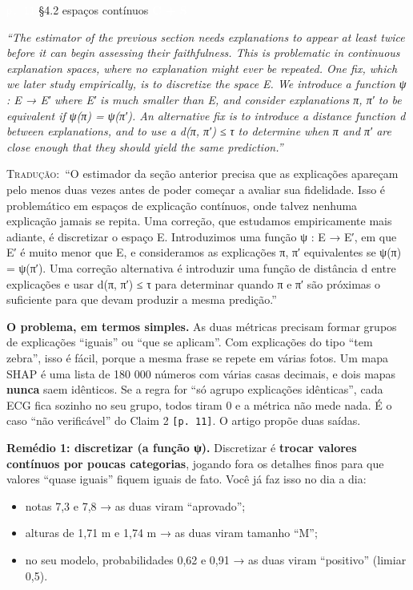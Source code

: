 \documentclass[11pt,a4paper]{article}
\newcommand{\metrictag}[2]{{\setlength{\fboxsep}{1.5pt}%
  \ifstrequal{#1}{c}{\colorbox{cC}{\textcolor{white}{\scriptsize\textbf{#2}}}}{%
  \ifstrequal{#1}{s}{\colorbox{cS}{\textcolor{white}{\scriptsize\textbf{#2}}}}{%
  \colorbox{black!60}{\textcolor{white}{\scriptsize\textbf{#2}}}}}}}
\newcommand{\pagechip}[1]{{\setlength{\fboxsep}{1.5pt}\colorbox{cAcc}{\textcolor{white}{\scriptsize\texttt{#1}}}}}
\newenvironment{origquote}{\par\itshape\small}{\par}
\newenvironment{tradquote}{\par\small\textsc{Tradução:}\ }{\par}
\newcommand{\explab}[1]{\par\smallskip{\small\color{cAcc}\textbf{\MakeUppercase{#1}}}\par}
\begin{document}
\begin{citacard}{\pagechip{p. 11} §4.2 espaços contínuos \metrictag{cs}{C + S}}
\begin{origquote}“The estimator of the previous section needs explanations to appear at least twice before it can begin assessing their faithfulness. This is problematic in continuous explanation spaces, where no explanation might ever be repeated. One fix, which we later study empirically, is to discretize the space E. We introduce a function ψ : E → E′ where E′ is much smaller than E, and consider explanations π, π′ to be equivalent if ψ(π) = ψ(π′). An alternative fix is to introduce a distance function d between explanations, and to use a d(π, π′) ≤ τ to determine when π and π′ are close enough that they should yield the same prediction.”\end{origquote}
\begin{tradquote}“O estimador da seção anterior precisa que as explicações apareçam pelo menos duas vezes antes de poder começar a avaliar sua fidelidade. Isso é problemático em espaços de explicação contínuos, onde talvez nenhuma explicação jamais se repita. Uma correção, que estudamos empiricamente mais adiante, é discretizar o espaço E. Introduzimos uma função ψ : E → E′, em que E′ é muito menor que E, e consideramos as explicações π, π′ equivalentes se ψ(π) = ψ(π′). Uma correção alternativa é introduzir uma função de distância d entre explicações e usar d(π, π′) ≤ τ para determinar quando π e π′ são próximas o suficiente para que devam produzir a mesma predição.”\end{tradquote}
\explab{Explicação}
\textbf{O problema, em termos simples.} As duas métricas precisam formar grupos de explicações “iguais” ou “que se aplicam”. Com explicações do tipo “tem zebra”, isso é fácil, porque a mesma frase se repete em várias fotos. Um mapa SHAP é uma lista de 180 000 números com várias casas decimais, e dois mapas \textbf{nunca} saem idênticos. Se a regra for “só agrupo explicações idênticas”, cada ECG fica sozinho no seu grupo, todos tiram 0 e a métrica não mede nada. É o caso “não verificável” do Claim 2 \texttt{[p. 11]}. O artigo propõe duas saídas.

\textbf{Remédio 1: discretizar (a função ψ).} Discretizar é \textbf{trocar valores contínuos por poucas categorias}, jogando fora os detalhes finos para que valores “quase iguais” fiquem iguais de fato. Você já faz isso no dia a dia:

\begin{itemize}
\item notas 7,3 e 7,8 → as duas viram “aprovado”;
\item alturas de 1,71 m e 1,74 m → as duas viram tamanho “M”;
\item no seu modelo, probabilidades 0,62 e 0,91 → as duas viram “positivo” (limiar 0,5).
\end{itemize}


\end{citacard}
\end{document}
